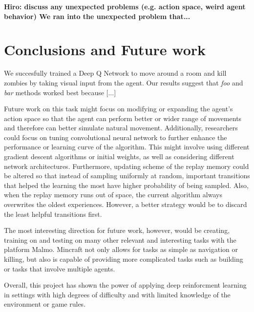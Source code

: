 \documentclass{article}
\begin{document}
\begin{multicols}{2}
\bf Hiro: discuss any unexpected problems (e.g. action space, weird agent behavior) \rm
We ran into the unexpected problem that...




\section{Conclusions and Future work}

We succesfully trained a Deep Q Network to move around a room and kill zombies by taking visual input from the agent.
Our results suggest that \emph{foo} and \emph{bar} methods worked best because [...]

Future work on this task might focus on modifying or expanding the agent's action space so that the agent can perform better or wider range of movements and therefore can better simulate natural movement. Additionally, researchers could focus on tuning convolutional neural network to further enhance the performance or learning curve of the algorithm. This might involve using different gradient descent algorithms or initial weights, as well as considering different network architectures. Furthermore, updating scheme of the replay memory could be altered so that instead of sampling uniformly at random, important transitions that helped the learning the most have higher probability of being sampled. Also, when the replay memory runs out of space, the current algorithm always overwrites the oldest experiences. However, a better strategy would be to discard the least helpful transitions first.  

The most interesting direction for future work, however, would be creating, training on and testing on many other relevant and interesting tasks with the platform Malmo. Mincraft not only allows for tasks as simple as navigation or killing, but also is capable of providing more complicated tasks such as building or tasks that involve multiple agents.   

Overall, this project has shown the power of applying deep reinforcment learning in settings with high degrees of difficulty and with limited knowledge of the environment or game rules.

\end{multicols}
\end{document}
